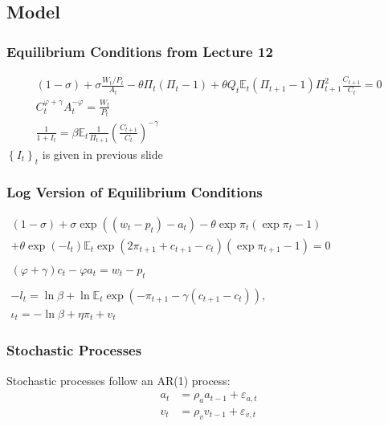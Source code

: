 \documentclass[10pt]{article}
\begin{document}
\subsection{Model}

\subsubsection{Equilibrium Conditions from Lecture 12}

$$
\begin{gathered}
(1-\sigma)+\sigma \frac{W_t / P_t}{A_t}-\theta \Pi_t\left(\Pi_t-1\right)+\theta Q_t \mathbb{E}_t\left(\Pi_{t+1}-1\right) \Pi_{t+1}^2 \frac{C_{t+1}}{C_t}=0 \\
C_t^{\varphi+\gamma} A_t^{-\varphi}=\frac{W_t}{P_t} \\
\frac{1}{1+I_t}=\beta \mathbb{E}_t \frac{1}{\Pi_{t+1}}\left(\frac{C_{t+1}}{C_t}\right)^{-\gamma}
\end{gathered}
$$
$\left\{I_t\right\}_t$ is given in previous slide

\subsubsection{Log Version of Equilibrium Conditions}

$\begin{gathered}
    (1-\sigma)+\sigma \exp \left(\left(w_t-p_t\right)-a_t\right)-\theta \exp \pi_t\left(\exp \pi_t-1\right) \\ 
    +\theta \exp \left(-l_t\right) \mathbb{E}_t \exp \left(2 \pi_{t+1}+c_{t+1}-c_t\right)\left(\exp \pi_{t+1}-1\right)=0 \\ 
    \\
    (\varphi+\gamma) c_t-\varphi a_t=w_t-p_t \\ 
    \\
    -l_t=\ln \beta+\ln \mathbb{E}_t \exp \left(-\pi_{t+1}-\gamma\left(c_{t+1}-c_t\right)\right), \\ 
    \iota_t=-\ln \beta+\eta \pi_t+v_t\end{gathered}$

\subsubsection{Stochastic Processes}

Stochastic processes follow an AR(1) process:
$$
\begin{aligned}
a_t & =\rho_a a_{t-1}+\varepsilon_{a, t} \\
v_t & =\rho_v v_{t-1}+\varepsilon_{v, t}
\end{aligned}
$$
\end{document}
